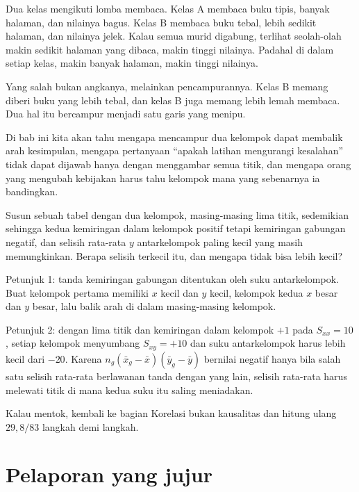 \begin{untukanak}
Dua kelas mengikuti lomba membaca. Kelas A membaca buku tipis, banyak halaman, dan
nilainya bagus. Kelas B membaca buku tebal, lebih sedikit halaman, dan nilainya jelek.
Kalau semua murid digabung, terlihat seolah-olah makin sedikit halaman yang dibaca,
makin tinggi nilainya. Padahal di dalam setiap kelas, makin banyak halaman, makin tinggi
nilainya.

Yang salah bukan angkanya, melainkan pencampurannya. Kelas B memang diberi buku yang
lebih tebal, dan kelas B juga memang lebih lemah membaca. Dua hal itu bercampur menjadi
satu garis yang menipu.

Di bab ini kita akan tahu mengapa mencampur dua kelompok dapat membalik arah kesimpulan,
mengapa pertanyaan ``apakah latihan mengurangi kesalahan'' tidak dapat dijawab hanya
dengan menggambar semua titik, dan mengapa orang yang mengubah kebijakan harus tahu
kelompok mana yang sebenarnya ia bandingkan.
\end{untukanak}

\begin{tantangan}
Susun sebuah tabel dengan dua kelompok, masing-masing lima titik, sedemikian sehingga
kedua kemiringan dalam kelompok positif tetapi kemiringan gabungan negatif, dan
selisih rata-rata $y$ antarkelompok paling kecil yang masih memungkinkan. Berapa
selisih terkecil itu, dan mengapa tidak bisa lebih kecil?

Petunjuk 1: tanda kemiringan gabungan ditentukan oleh suku antarkelompok. Buat
kelompok pertama memiliki $x$ kecil dan $y$ kecil, kelompok kedua $x$ besar dan $y$
besar, lalu balik arah di dalam masing-masing kelompok.

Petunjuk 2: dengan lima titik dan kemiringan dalam kelompok $+1$ pada
$S_{xx}=10$, setiap kelompok menyumbang $S_{xy}=+10$ dan suku antarkelompok harus
lebih kecil dari $-20$. Karena $n_g(\bar x_g-\bar x)(\bar y_g-\bar y)$ bernilai
negatif hanya bila salah satu selisih rata-rata berlawanan tanda dengan yang lain,
selisih rata-rata harus melewati titik di mana kedua suku itu saling meniadakan.

Kalau mentok, kembali ke bagian Korelasi bukan kausalitas dan hitung ulang
$29{,}8/83$ langkah demi langkah.
\end{tantangan}

\section{Pelaporan yang jujur}

